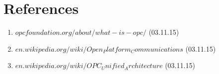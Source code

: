 \documentclass[english]{article}
\begin{document}
\section{References}
\begin{enumerate}
\item $opcfoundation.org/about/what-is-opc/ $ (03.11.15)
\item $en.wikipedia.org/wiki/Open_Platform_Communications  $ (03.11.15)
\item $en.wikipedia.org/wiki/OPC_Unified_Architecture$ (03.11.15)
\end{enumerate}
\end{document}
